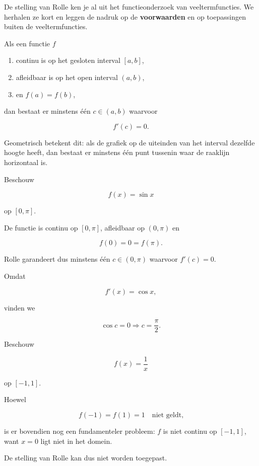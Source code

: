 \documentclass{ximera}
\begin{document}

De stelling van Rolle ken je al uit het functieonderzoek van
veeltermfuncties. We herhalen ze kort en leggen de nadruk op de
\textbf{voorwaarden} en op toepassingen buiten de veeltermfuncties.

\begin{eigenschap}
Als een functie \(f\)

\begin{enumerate}
  \item continu is op het gesloten interval \([a,b]\),
  \item afleidbaar is op het open interval \((a,b)\),
  \item en \(f(a)=f(b)\),
\end{enumerate}

dan bestaat er minstens één \(c\in(a,b)\) waarvoor

\[\boxed{f'(c)=0.}\]
\end{eigenschap}

Geometrisch betekent dit: als de grafiek op de uiteinden van het interval
dezelfde hoogte heeft, dan bestaat er minstens één punt tussenin waar de
raaklijn horizontaal is.

\begin{voorbeeld}
Beschouw

\[f(x)=\sin x\]

op \([0,\pi]\).

De functie is continu op \([0,\pi]\), afleidbaar op \((0,\pi)\) en

\[f(0)=0=f(\pi).\]

Rolle garandeert dus minstens één \(c\in(0,\pi)\) waarvoor \(f'(c)=0\).

Omdat

\[f'(x)=\cos x,\]

vinden we

\[\cos c=0 \Longrightarrow c=\frac{\pi}{2}.\]
\end{voorbeeld}

\begin{voorbeeld}
Beschouw

\[f(x)=\frac1x\]

op \([-1,1]\).

Hoewel

\[f(-1)=f(1)=1 \quad\text{niet geldt,}\]

is er bovendien nog een fundamenteler probleem: \(f\) is niet continu op
\([-1,1]\), want \(x=0\) ligt niet in het domein.

De stelling van Rolle kan dus niet worden toegepast.
\end{voorbeeld}
\end{document}
